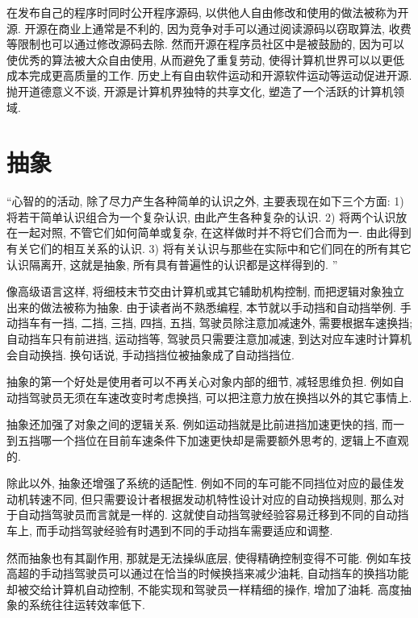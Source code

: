         在发布自己的程序时同时公开程序源码, 以供他人自由修改和使用的做法被称为开源. 开源在商业上通常是不利的, 因为竞争对手可以通过阅读源码以窃取算法, 收费等限制也可以通过修改源码去除. 然而开源在程序员社区中是被鼓励的, 因为可以使优秀的算法被大众自由使用, 从而避免了重复劳动, 使得计算机世界可以以更低成本完成更高质量的工作. 历史上有自由软件运动和开源软件运动等运动促进开源. 抛开道德意义不谈, 开源是计算机界独特的共享文化, 塑造了一个活跃的计算机领域.

    \section{抽象}
        ``心智的的活动, 除了尽力产生各种简单的认识之外, 主要表现在如下三个方面: 1) 将若干简单认识组合为一个复杂认识, 由此产生各种复杂的认识. 2) 将两个认识放在一起对照, 不管它们如何简单或复杂, 在这样做时并不将它们合而为一. 由此得到有关它们的相互关系的认识. 3) 将有关认识与那些在实际中和它们同在的所有其它认识隔离开, 这就是抽象, 所有具有普遍性的认识都是这样得到的. ''


        像高级语言这样, 将细枝末节交由计算机或其它辅助机构控制, 而把逻辑对象独立出来的做法被称为抽象. 由于读者尚不熟悉编程, 本节就以手动挡和自动挡举例. 手动挡车有一挡, 二挡, 三挡, 四挡, 五挡, 驾驶员除注意加减速外, 需要根据车速换挡; 自动挡车只有前进挡, 运动挡等, 驾驶员只需要注意加减速, 到达对应车速时计算机会自动换挡. 换句话说, 手动挡挡位被抽象成了自动挡挡位.
        
        抽象的第一个好处是使用者可以不再关心对象内部的细节, 减轻思维负担. 例如自动挡驾驶员无须在车速改变时考虑换挡, 可以把注意力放在换挡以外的其它事情上.

        抽象还加强了对象之间的逻辑关系. 例如运动挡就是比前进挡加速更快的挡, 而一到五挡哪一个挡位在目前车速条件下加速更快却是需要额外思考的, 逻辑上不直观的.

        除此以外, 抽象还增强了系统的适配性. 例如不同的车可能不同挡位对应的最佳发动机转速不同, 但只需要设计者根据发动机特性设计对应的自动换挡规则, 那么对于自动挡驾驶员而言就是一样的. 这就使自动挡驾驶经验容易迁移到不同的自动挡车上, 而手动挡驾驶经验有时遇到不同的手动挡车需要适应和调整.
        
        然而抽象也有其副作用, 那就是无法操纵底层, 使得精确控制变得不可能. 例如车技高超的手动挡驾驶员可以通过在恰当的时候换挡来减少油耗, 自动挡车的换挡功能却被交给计算机自动控制, 不能实现和驾驶员一样精细的操作, 增加了油耗. 高度抽象的系统往往运转效率低下.

